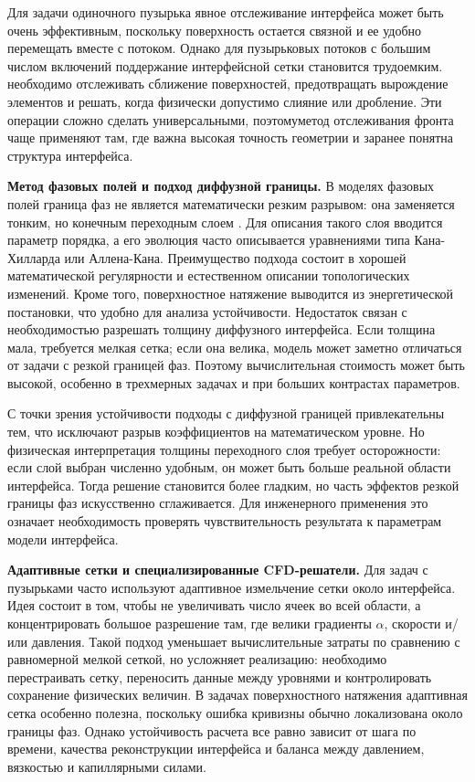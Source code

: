 \documentclass[12pt,a4paper]{article}
\begin{document}
Для задачи одиночного пузырька явное отслеживание интерфейса может быть очень
эффективным, поскольку поверхность остается связной и ее удобно перемещать
вместе с потоком. Однако для пузырьковых потоков с большим числом включений
поддержание интерфейсной сетки становится трудоемким. необходимо отслеживать
сближение поверхностей, предотвращать вырождение элементов и решать, когда
физически допустимо слияние или дробление. Эти операции сложно сделать
универсальными, поэтомуметод отслеживания фронта чаще применяют там, где важна высокая
точность геометрии и заранее понятна структура интерфейса.

\textbf{Метод фазовых полей и подход диффузной границы.}
В моделях фазовых полей граница фаз не является математически резким разрывом:
она заменяется тонким, но конечным переходным слоем \cite{Anderson1998}. Для
описания такого слоя вводится параметр порядка, а его эволюция часто
описывается уравнениями типа Кана-Хилларда или Аллена-Кана. Преимущество
подхода состоит в хорошей математической регулярности и естественном описании
топологических изменений. Кроме того, поверхностное натяжение выводится из
энергетической постановки, что удобно для анализа устойчивости. Недостаток
связан с необходимостью разрешать толщину диффузного интерфейса. Если толщина
мала, требуется мелкая сетка; если она велика, модель может заметно отличаться
от задачи с резкой границей фаз. Поэтому вычислительная стоимость может быть
высокой, особенно в трехмерных задачах и при больших контрастах параметров.

С точки зрения устойчивости подходы с диффузной границей привлекательны тем, что
исключают разрыв коэффициентов на математическом уровне. Но физическая
интерпретация толщины переходного слоя требует осторожности: если слой выбран
численно удобным, он может быть больше реальной области интерфейса. Тогда
решение становится более гладким, но часть эффектов резкой границы фаз
искусственно сглаживается. Для инженерного применения это означает
необходимость проверять чувствительность результата к параметрам модели
интерфейса.

\textbf{Адаптивные сетки и специализированные CFD-решатели.}
Для задач с пузырьками часто используют адаптивное измельчение сетки около
интерфейса. Идея состоит в том, чтобы не увеличивать число ячеек во всей
области, а концентрировать большое разрешение там, где велики градиенты \(\alpha\),
скорости и/или давления. Такой подход уменьшает вычислительные затраты по
сравнению с равномерной мелкой сеткой, но усложняет реализацию: необходимо
перестраивать сетку, переносить данные между уровнями и контролировать
сохранение физических величин. В задачах поверхностного натяжения адаптивная
сетка особенно полезна, поскольку ошибка кривизны обычно локализована около
границы фаз. Однако устойчивость расчета все равно зависит от шага по времени,
качества реконструкции интерфейса и баланса между давлением, вязкостью и
капиллярными силами.
\end{document}
